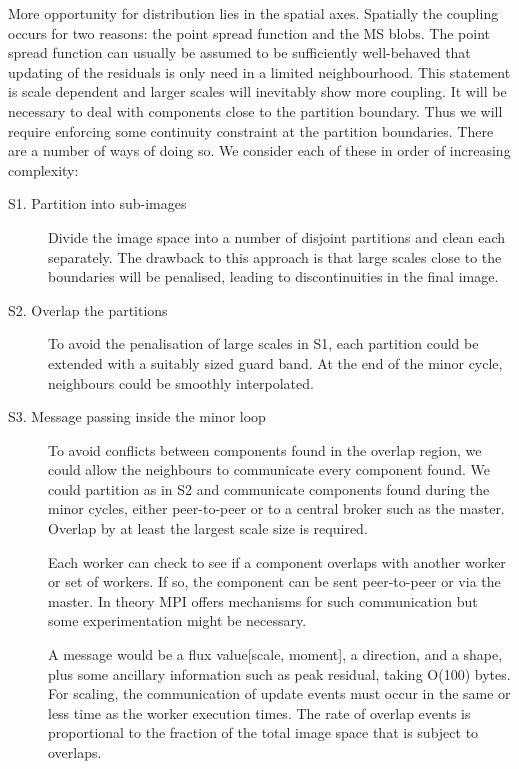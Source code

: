 \documentclass[11pt,a4paper,variablewidth]{article}
\begin{document}
More opportunity for distribution lies in the spatial axes. Spatially the coupling occurs for two reasons: the point spread function and the MS blobs. The point spread function can usually be assumed to be sufficiently well-behaved that updating of the residuals is only need in a limited neighbourhood. This statement is scale dependent and larger scales will inevitably show more coupling. It will be necessary to deal with components close to the partition boundary. Thus we will require enforcing some continuity constraint at the partition boundaries. There are a number of ways of doing so. We consider each of these in order of increasing complexity:

\begin{description}
\item[S1. Partition into sub-images]

Divide the image space into a number of disjoint partitions and clean each separately. The drawback to this approach is that large scales close to the boundaries will be penalised, leading to discontinuities in the final image.

\item[S2. Overlap the partitions]

To avoid the penalisation of large scales in S1, each partition could be extended with a suitably sized guard band. At the end of the minor cycle, neighbours could be smoothly interpolated. 

\item[S3. Message passing inside the minor loop]

To avoid conflicts between components found in the overlap region, we could allow the neighbours to communicate every component found. We could partition as in S2 and communicate components found during the minor cycles, either peer-to-peer or to a central broker such as the master. Overlap by at least the largest scale size is required.

Each worker can check to see if a component overlaps with another worker or set of workers. If so, the component can be sent peer-to-peer or via the master. In theory MPI offers mechanisms for such communication but some experimentation might be necessary.

A message would be a flux value[scale, moment], a direction, and a shape, plus some ancillary information such as peak residual, taking O(100) bytes. For scaling, the communication of update events must occur in the same or less time as the worker execution times. The rate of overlap events is proportional to the fraction of the total image space that is subject to overlaps.

\end{description}
\end{document}
